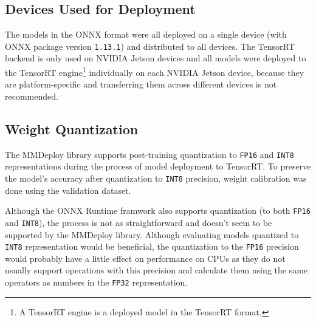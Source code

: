 \subsection*{Devices Used for Deployment}

The models in the ONNX format were all deployed on a single device (with ONNX
package version \texttt{1.13.1}) and distributed to all devices. The TensorRT
backend is only used on NVIDIA Jetson devices and all models were deployed to
the TensorRT engine\footnote{A TensorRT engine is a deployed model in the
TensorRT format.} individually on each NVIDIA Jetson device, because they are
platform-specific and transferring them across different devices is not
recommended.




\subsection*{Weight Quantization}

The MMDeploy library supports post-training quantization to \texttt{FP16} and
\texttt{INT8} representations during the process of model deployment to TensorRT.
To preserve the model's accuracy after quantization to \texttt{INT8} precision, weight calibration
was done using the validation dataset.


Although the ONNX Runtime framwork also supports quantization (to both
\texttt{FP16} and \texttt{INT8}), the process is not as straightforward and
doesn't seem to be supported by the MMDeploy library. Although evaluating models
quantized to \texttt{INT8} representation would be beneficial, the quantization
to the \texttt{FP16} precision would probably have a little effect on performance on CPUs as
they do not usually support operations with this precision and calculate them using the same
operators as numbers in the \texttt{FP32} representation.

